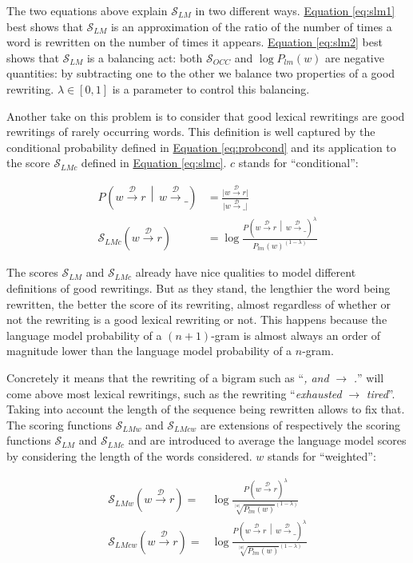 \documentclass[a4paper, 11pt, onepage]{scrreprt}
\newcommand\equaref[1]{\hyperref[#1]{Equation \ref*{#1}}}
\newcommand\maps[1]{\xrightarrow{\mathcal{#1}}}
\newcommand\card[1]{\lvert #1 \rvert}
\newcommand\given{\, \middle| \,}
\newcommand\proba[2][]{P_{#1} \left( #2 \right)}
\begin{document}
The two equations above explain $\mathcal{S}_{LM}$ in two different
ways. \equaref{eq:slm1} best shows that $\mathcal{S}_{LM}$ is an
approximation of the ratio of the number of times a word is rewritten
on the number of times it appears. \equaref{eq:slm2} best shows that
$\mathcal{S}_{LM}$ is a balancing act: both $\mathcal{S}_{OCC}$ and
$\log \proba[lm]{w}$ are negative quantities: by subtracting one to
the other we balance two properties of a good rewriting. $\lambda \in
\left[0,1\right]$ is a parameter to control this balancing.

Another take on this problem is to consider that good lexical
rewritings are good rewritings of rarely occurring words. This
definition is well captured by the conditional probability defined in
\equaref{eq:probcond} and its application to the score
$\mathcal{S}_{LMc}$ defined in \equaref{eq:slmc}. $c$ stands for
“conditional”:

\begin{align}
  \label{eq:probcond}
  \proba{w \maps{D} r \given w \maps{D} \_} & = \frac%
  {\card{w \maps{D} r}}%
  {\card{w \maps{D} \_}} \\
  \label{eq:slmc}
  \mathcal{S}_{LMc}(w \maps{D} r) & = \log \frac%
  {\proba{w \maps{D} r \given w \maps{D} \_}^\lambda}%
  {\proba[lm]{w}^{(1 - \lambda)}}
\end{align}

The scores $\mathcal{S}_{LM}$ and $\mathcal{S}_{LMc}$ already have
nice qualities to model different definitions of good rewritings. But
as they stand, the lengthier the word being rewritten, the better the
score of its rewriting, almost regardless of whether or not the
rewriting is a good lexical rewriting or not. This happens because the
language model probability of a $(n+1)$-gram is almost always an order
of magnitude lower than the language model probability of a
$n$-gram.

Concretely it means that the rewriting of a bigram such as “\emph{,
  and} $\rightarrow$ \emph{.}”  will come above most lexical
rewritings, such as the rewriting “\emph{exhausted} $\rightarrow$
\emph{tired}”. Taking into account the length of the sequence being
rewritten allows to fix that. The scoring functions
$\mathcal{S}_{LMw}$ and $\mathcal{S}_{LMcw}$ are extensions of
respectively the scoring functions $\mathcal{S}_{LM}$ and
$\mathcal{S}_{LMc}$ and are introduced to average the language model
scores by considering the length of the words considered. $w$ stands
for “weighted”:

\begin{align}
  \label{eq:slmw}
  \mathcal{S}_{LMw}(w \maps{D} r) = & \log \frac%
  {\proba{w \maps{D} r}^\lambda}%
  {\sqrt[\card{w}]{\proba[lm]{w}}^{(1 - \lambda)}} \\
  \label{eq:slmcw}
  \mathcal{S}_{LMcw}(w \maps{D} r) = & \log \frac%
  {\proba{w \maps{D} r \given w \maps{D} \_}^\lambda}%
  {\sqrt[\card{w}]{\proba[lm]{w}}^{(1 - \lambda)}} \\
\end{align}
\end{document}
